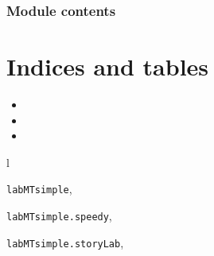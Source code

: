 \documentclass[letterpaper,10pt,english]{sphinxmanual}
\begin{document}
\subsection{Module contents}
\label{labMTsimple:module-contents}\label{labMTsimple:module-labMTsimple}

\chapter{Indices and tables}
\label{index:indices-and-tables}\begin{itemize}
\item {} 

\item {} 

\item {} 

\end{itemize}


\renewcommand{\indexname}{Python Module Index}
\begin{theindex}
\def\bigletter#1{{\Large\sffamily#1}\nopagebreak\vspace{1mm}}
\bigletter{l}
\item {\texttt{labMTsimple}}, \pageref{labMTsimple:module-labMTsimple}
\item {\texttt{labMTsimple.speedy}}, \pageref{labMTsimple:module-labMTsimple.speedy}
\item {\texttt{labMTsimple.storyLab}}, \pageref{labMTsimple:module-labMTsimple.storyLab}
\end{theindex}

\renewcommand{\indexname}{Index}
\printindex
\end{document}
